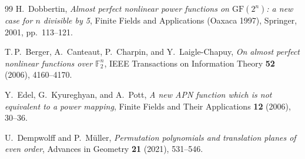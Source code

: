 \documentclass[11pt]{article}
\begin{document}
\begin{thebibliography}{99}
H.~Dobbertin,
\textit{Almost perfect nonlinear power functions on $\mathrm{GF}(2^n)$: a new case for $n$ divisible by 5},
Finite Fields and Applications (Oaxaca 1997),
Springer, 2001, pp.~113--121.

T.\,P.~Berger, A.~Canteaut, P.~Charpin, and Y.~Laigle-Chapuy,
\textit{On almost perfect nonlinear functions over $\mathbb{F}_2^n$},
IEEE Transactions on Information Theory \textbf{52} (2006), 4160--4170.

Y.~Edel, G.~Kyureghyan, and A.~Pott,
\textit{A new APN function which is not equivalent to a power mapping},
Finite Fields and Their Applications \textbf{12} (2006), 30--36.

U.~Dempwolff and P.~M\"{u}ller,
\textit{Permutation polynomials and translation planes of even order},
Advances in Geometry \textbf{21} (2021), 531--546.

\end{thebibliography}
\end{document}

